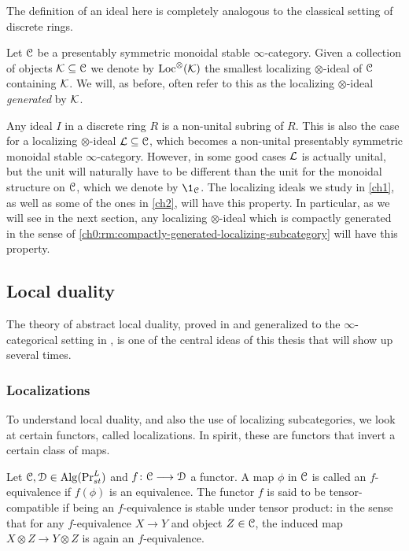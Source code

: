 The definition of an ideal here is completely analogous to the classical setting of discrete rings. 

\begin{definition}
    Let $\EuScript{C}$ be a presentably symmetric monoidal stable $\infty$-category. Given a collection of objects $\mathcal{K}\subseteq \EuScript{C}$ we denote by $\operatorname{Loc}^\otimes(\mathcal{K})$ the smallest localizing $\otimes$-ideal of $\EuScript{C}$ containing $\mathcal{K}$. We will, as before, often refer to this as the localizing $\otimes$-ideal \emph{generated} by $\mathcal{K}$. 
\end{definition}

Any ideal $I$ in a discrete ring $R$ is a non-unital subring of $R$. This is also the case for a localizing $\otimes$-ideal $\mathcal{L}\subseteq \EuScript{C}$, which becomes a non-unital presentably symmetric monoidal stable $\infty$-category. However, in some good cases $\mathcal{L}$ is actually unital, but the unit will naturally have to be different than the unit for the monoidal structure on $\EuScript{C}$, which we denote by $\1_\C$. The localizing ideals we study in \cref{ch1}, as well as some of the ones in \cref{ch2}, will have this property. In particular, as we will see in the next section, any localizing $\otimes$-ideal which is compactly generated in the sense of \cref{ch0:rm:compactly-generated-localizing-subcategory} will have this property.





\subsection{Local duality}
\label{ch0:ssec:local-duality}

The theory of abstract local duality, proved in \cite{hovey-palmiery-strickland_97} and generalized to the $\infty$-categorical setting in \cite{barthel-heard-valenzuela_2018}, is one of the central ideas of this thesis that will show up several times. 

\subsubsection{Localizations}

To understand local duality, and also the use of localizing subcategories, we look at certain functors, called localizations. In spirit, these are functors that invert a certain class of maps. 

\begin{definition}
    \label{ch0:def:L-equivalence}
    Let $\EuScript{C}, \EuScript{D}\in \operatorname{Alg}(\mathrm{Pr}_{st}^L)$ and $f\colon \EuScript{C}\longrightarrow \EuScript{D}$ a functor. A map $\phi$ in $\EuScript{C}$ is called an { $f$-equivalence} if $f(\phi)$ is an equivalence. The functor $f$ is said to be { tensor-compatible} if being an $f$-equivalence is stable under tensor product: in the sense that for any $f$-equivalence $X\longrightarrow Y$ and object $Z\in \EuScript{C}$, the induced map $X\otimes Z\longrightarrow Y\otimes Z$ is again an $f$-equivalence. 
\end{definition}

